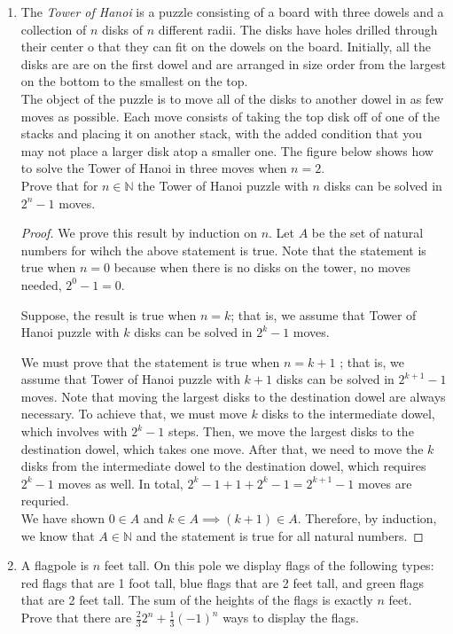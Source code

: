 \documentclass[12pt]{article}
\newcommand{\N}{\mathbb{N}}
\begin{document}
\begin{enumerate}
		\item The \textit{Tower of Hanoi} is a puzzle consisting of a board with three dowels and a collection of $n$ disks of $n$ different radii. The disks have holes drilled through their center o that they can fit on the dowels on the board. Initially, all the disks are are on the first dowel and are arranged in size order from the largest on the bottom to the smallest on the top. \\
		The object of the puzzle is to move all of the disks to another dowel in as few moves as possible. Each move consists of taking the top disk off of one of the stacks and placing it on another stack, with the added condition that you may not place a larger disk atop a smaller one. The figure below shows how to solve the Tower of Hanoi in three moves when $n = 2$.\\
		Prove that for $n \in \mathbb{N}$ the Tower of Hanoi puzzle with $n$ disks can be solved in $2^n-1$ moves.
		\begin{proof}
			We prove this result by induction on $n$. Let $A$ be the set of natural numbers for wihch the above statement is true.
			Note that the statement is true when $n=0$ because when there is no disks on the tower, no moves needed, $2^0-1 =0$. 
			
			Suppose, the result is true when $n=k$; that is, we assume that Tower of Hanoi puzzle with $k$ disks can be solved in  $2^k -1$ moves.
			
			We must prove that the statement is true when $n=k+1$ ; that is, we assume that Tower of Hanoi puzzle with $k+1$ disks can be solved in  $2^{k+1} -1$ moves. Note that moving the largest disks to the destination dowel are always necessary. To achieve that, we must move $k$ disks to the intermediate dowel, which involves with $2^k-1$ steps. Then, we move the largest disks to the destination dowel, which takes one move. After that, we need to move the $k$ disks from the intermediate dowel to the destination dowel, which requires $2^k-1$ moves as well. In total, $2^k-1 + 1 + 2^k-1 = 2^{k+1} -1$ moves are requried.\\
			We have shown $0 \in A$ and $k \in A \implies (k+1) \in A$. Therefore, by induction, we know that $A \in \N$ and the statement is true for all natural numbers.
		\end{proof}
		
		\item A flagpole is $n$ feet tall. On this pole we display flags of the following types: red flags that are 1 foot tall, blue flags that are 2 feet tall, and green flags that are 2 feet tall. The sum of the heights of the flags is exactly $n$ feet.\\
		Prove that there are $\displaystyle \frac{2}{3} 2^n + \frac{1}{3} (-1)^n$ ways to display the flags.
		

\end{enumerate}
\end{document}
